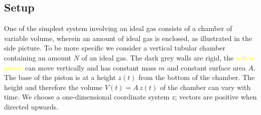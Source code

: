\documentclass[a4paper,12pt,%
onecolumn,oneside,%
british%
]{memoir}
\renewcommand*{\|}[1][]{\nonscript\:#1\vert\nonscript\:\mathopen{}}
\newcommand*{\yN}{N}
\newcommand*{\yM}{m}%
\begin{document}
\subsection{Setup}
\label{sec:idealgas_ex_setup}

One of the simplest system involving an ideal gas consists of a chamber of variable volume, wherein an amount of ideal gas is enclosed, as illustrated in the side picture.
To be more specific we consider a vertical tubular chamber containing an amount $\yN$ of an ideal gas. The \textcolor{midgrey}{dark grey walls} are rigid, the \textcolor{yellow}{yellow piston} can move vertically and has constant mass $\yM$ and constant surface area $A$.
%
%
The base of the piston is at a height $z(t)$ from the bottom of the chamber. The height and therefore the volume $V(t) = A\,z(t)$ of the chamber can vary with time. We choose a one-dimensional coordinate system $z$; vectors are positive when directed upwards.
\end{document}

